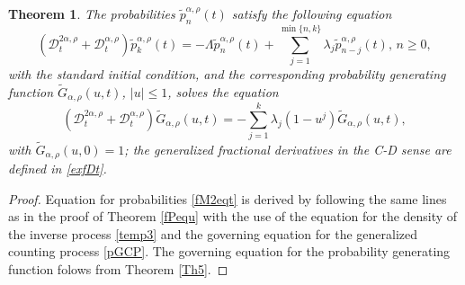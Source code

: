 \documentclass[12pt]{article}
\theoremstyle{definition}
\theoremstyle{plain}
\newtheorem{theorem}{Theorem}
\begin{document}
\begin{theorem}%
The probabilities ${\tilde p}_n^{\alpha,\rho}(t)$
satisfy the following  equation
\begin{equation}\label{fM2eqt}
	\left({\mathcal D}^{2\alpha,\rho}_t + {\mathcal D}^{\alpha,\rho}_t\right) \tilde p_k^{\alpha,\rho}(t) = - \Lambda \tilde p_n^{\alpha,\rho}(t) + \sum_{j=1}^{\min\{n,k\}}\lambda_j \tilde p_{n-j}^{\alpha,\rho}(t), \, n\geq0, 
\end{equation}
with the standard initial condition,
and  the corresponding probability generating function $%
	\tilde{G}_{\alpha,\rho}(u, t)$, $|u| \leq 1$, solves the equation
	\begin{equation*}%
		\left({\mathcal D}^{2\alpha,\rho}_t + {\mathcal D}^{\alpha,\rho}_t\right)  \tilde G_{\alpha,\rho}(u, t) = -\sum_{j=1}^{k}\lambda_j(1-u^j)\tilde G_{\alpha,\rho}(u, t), 
	\end{equation*}
	with $\tilde G_{\alpha,\rho}(u, 0) = 1$; 
  the generalized fractional derivatives in the C-D sense are defined in \eqref{exfDt}.
\end{theorem}
\begin{proof}
Equation for probabilities \eqref{fM2eqt} is derived by following the same lines as in the proof of Theorem \ref{fPequ} with the use of the  equation for the density of the inverse process \eqref{temp3} and the governing equation for the generalized  counting process \eqref{pGCP}. The governing equation for the probability generating function folows from Theorem \ref{Th5}.
\end{proof}
\end{document}
